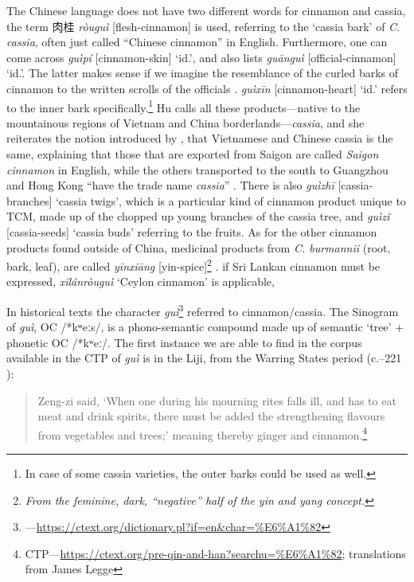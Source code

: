 The Chinese language does not have two different words for cinnamon and cassia, the term 肉桂 \textit{ròuguì} [flesh-cinnamon] is used, referring to the `cassia bark' of \textit{C. cassia}, often just called ``Chinese cinnamon'' in English. Furthermore, one can come across  \textit{guìpí} [cinnamon-skin] `id.', and \textcite[399]{hu_food_2005} also lists  \textit{guānguì} [official-cinnamon] `id.'. The latter makes sense if we imagine the resemblance of the curled barks of cinnamon to the written scrolls of the officials \parencite[see][732]{zhang_dictionary_2015}.  \textit{guìxīn} [cinnamon-heart] `id.' refers to the inner bark specifically.\footnote{In case of some cassia varieties, the outer barks could be used as well.} Hu calls all these products---native to the mountainous regions of Vietnam and China borderlands---\textit{cassia}, and she reiterates the notion introduced by \parencite{ravindran_cinnamon_2004}, that Vietnamese and Chinese cassia is the same, explaining that those that are exported from Saigon are called \textit{Saigon cinnamon} in English, while the others transported to the south to Guangzhou and Hong Kong ``have the trade name \textit{cassia}'' \parencite[400]{hu_food_2005}. There is also  \textit{guìzhī} [cassia-branches] `cassia twigs', which is a particular kind of cinnamon product unique to \gls{TCM}, made up of the chopped up young branches of the cassia tree, and  \textit{guìzǐ} [cassia-seeds] `cassia buds' referring to the fruits. As for the other cinnamon products found outside of China, medicinal products from \textit{C. burmannii} (root, bark, leaf), are called  \textit{yīnxiāng} [yin-spice]\footnote{\textit{From the feminine, dark, ``negative'' half of the yin and yang concept.}} \parencite[179]{hu_enumeration_1999}.
if Sri Lankan cinnamon must be expressed,  \textit{xīlánròuguì} `Ceylon cinnamon' is applicable, 

In historical texts the character  \textit{guì}\footnote{---\url{https://ctext.org/dictionary.pl?if=en&char=\%E6\%A1\%82}} referred to cinnamon/cassia. The Sinogram of \textit{guì}, \gls{OC} /*kʷeːs/, is a phono-semantic compound made up of semantic  `tree' + phonetic  \gls{OC} /*kʷeː/.
The first instance we are able to find in the corpus available in the \gls{CTP} of \textit{guì} is in the \gls{Liji}, from the Warring States period (c.--221 \BC{}):

\begin{quote}
    Zeng-zi said, `When one during his mourning rites falls ill, and has to eat meat and drink spirits, there must be added the strengthening flavours from vegetables and trees;' meaning thereby ginger and cinnamon.\footnote{\gls{CTP}---\url{https://ctext.org/pre-qin-and-han?searchu=\%E6\%A1\%82}; translations from James Legge}
\end{quote}

